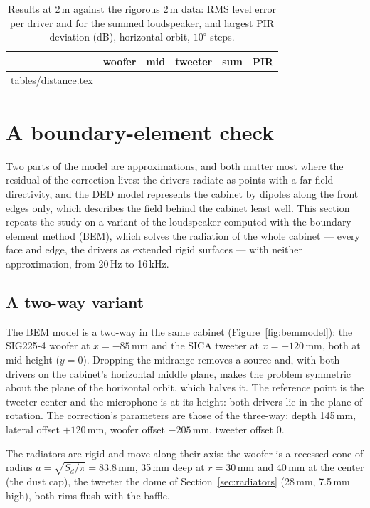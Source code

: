 \documentclass[11pt,a4paper]{article}
\makeatletter
\newcommand{\rows}[1]{\@@input tables/#1.tex }
\makeatother
\begin{document}
\begin{table}[tbp]
  \centering
  \caption{Results at 2\,m against the rigorous 2\,m data: RMS level error per driver and for the summed
  loudspeaker, and largest PIR deviation (dB), horizontal orbit, $10^\circ$ steps.}
  \label{tab:distance}
  \small
  \begin{tabular}{lccccc}
    \toprule
    & woofer & mid & tweeter & sum & PIR\\
    \midrule
    \rows{distance}
    \bottomrule
  \end{tabular}
\end{table}

\section{A boundary-element check}
\label{sec:bem}

Two parts of the model are approximations, and both matter most where the residual of the correction
lives: the drivers radiate as points with a far-field directivity, and the DED model represents the
cabinet by dipoles along the front edges only, which describes the field behind the cabinet least
well. This section repeats the study on a variant of the loudspeaker computed with the
boundary-element method (BEM), which solves the radiation of the whole cabinet --- every face and
edge, the drivers as extended rigid surfaces --- with neither approximation, from 20\,Hz to 16\,kHz.

\subsection{A two-way variant}

The BEM model is a two-way in the same cabinet (Figure~\ref{fig:bemmodel}): the SIG225-4 woofer at
$x=-85$\,mm and the SICA tweeter at $x=+120$\,mm, both at mid-height ($y=0$). Dropping the midrange
removes a source and, with both drivers on the cabinet's horizontal middle plane, makes the problem
symmetric about the plane of the horizontal orbit, which halves it. The reference point is the
tweeter center and the microphone is at its height: both drivers lie in the plane of rotation. The
correction's parameters are those of the three-way: depth 145\,mm, lateral offset $+120$\,mm, woofer
offset $-205$\,mm, tweeter offset 0.

The radiators are rigid and move along their axis: the woofer is a recessed cone of radius
$a=\sqrt{S_d/\pi}=83.8$\,mm, 35\,mm deep at $r=30$\,mm and 40\,mm at the center (the dust cap), the
tweeter the dome of Section~\ref{sec:radiators} (28\,mm, 7.5\,mm high), both rims flush with the
baffle.
\end{document}
